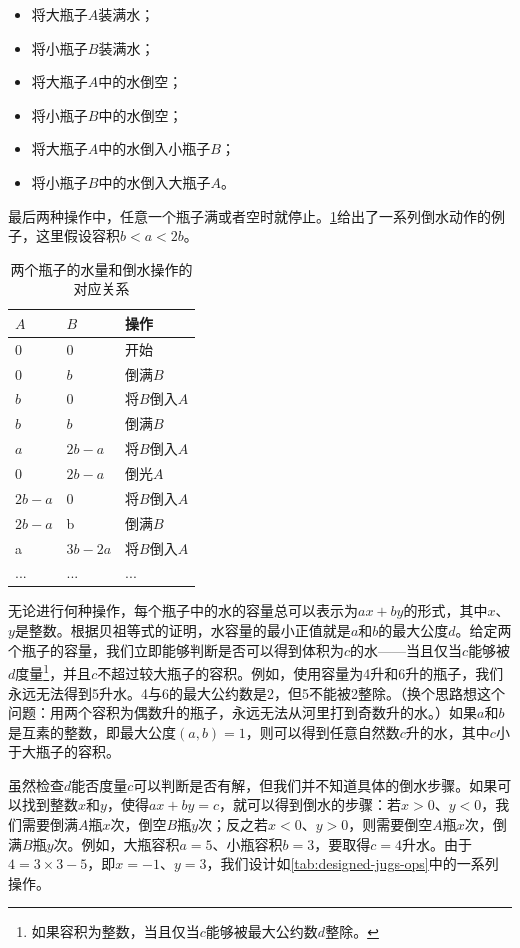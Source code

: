 \documentclass[b5paper]{ctexart}
\begin{document}
\begin{itemize}
\item 将大瓶子$A$装满水；
\item 将小瓶子$B$装满水；
\item 将大瓶子$A$中的水倒空；
\item 将小瓶子$B$中的水倒空；
\item 将大瓶子$A$中的水倒入小瓶子$B$；
\item 将小瓶子$B$中的水倒入大瓶子$A$。
\end{itemize}

最后两种操作中，任意一个瓶子满或者空时就停止。\cref{tab:jug-ops}给出了一系列倒水动作的例子，这里假设容积$b < a < 2b$。

\begin{table}[htbp]
\centering
\begin{tabular}{|l|l|l|}
\hline
$A$ & $B$ & 操作 \\
\hline
0 & 0 & 开始 \\
0 & $b$ & 倒满$B$ \\
$b$ & 0 & 将$B$倒入$A$ \\
$b$ & $b$ & 倒满$B$ \\
$a$ & $2b - a$ & 将$B$倒入$A$ \\
0 & $2b - a$ & 倒光$A$ \\
$2b - a$ & 0 & 将$B$倒入$A$ \\
$2b - a$ & b & 倒满$B$ \\
a & $3b - 2a$ & 将$B$倒入$A$ \\
... & ... & ... \\
\hline
\end{tabular}
\caption{两个瓶子的水量和倒水操作的对应关系}
\label{tab:jug-ops}
\end{table}

无论进行何种操作，每个瓶子中的水的容量总可以表示为$ax + by$的形式，其中$x$、$y$是整数。根据贝祖等式的证明，水容量的最小正值就是$a$和$b$的最大公度$d$。给定两个瓶子的容量，我们立即能够判断是否可以得到体积为$c$的水——当且仅当$c$能够被$d$度量\footnote{如果容积为整数，当且仅当$c$能够被最大公约数$d$整除。}，并且$c$不超过较大瓶子的容积。例如，使用容量为4升和6升的瓶子，我们永远无法得到5升水。4与6的最大公约数是2，但5不能被2整除。（换个思路想这个问题：用两个容积为偶数升的瓶子，永远无法从河里打到奇数升的水。）如果$a$和$b$是互素的整数，即最大公度$(a, b) = 1$，则可以得到任意自然数$c$升的水，其中$c$小于大瓶子的容积。

虽然检查$d$能否度量$c$可以判断是否有解，但我们并不知道具体的倒水步骤。如果可以找到整数$x$和$y$，使得$ax + by = c$，就可以得到倒水的步骤：若$x > 0$、$y < 0$，我们需要倒满$A$瓶$x$次，倒空$B$瓶$y$次；反之若$x < 0$、$y > 0$，则需要倒空$A$瓶$x$次，倒满$B$瓶$y$次。例如，大瓶容积$a=5$、小瓶容积$b=3$，要取得$c=4$升水。由于$4 = 3 \times 3 - 5$，即$x = -1$、$y = 3$，我们设计如\cref{tab:designed-jugs-ops}中的一系列操作。
\end{document}
